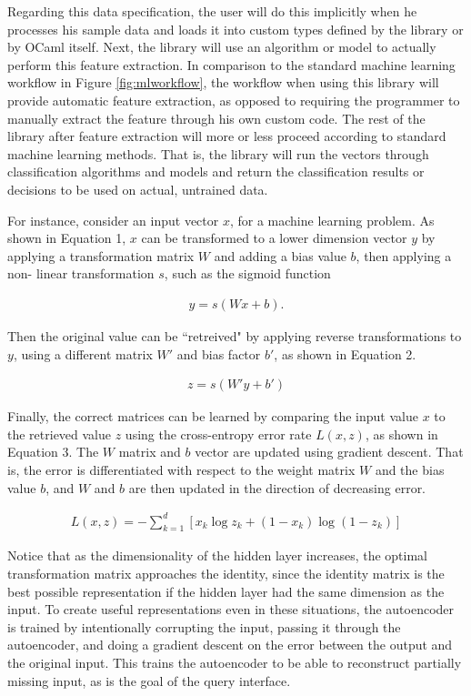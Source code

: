 \documentclass{sig-alternate}
\begin{document}
\vspace{10pt}

Regarding this data specification, the user will do this implicitly when he processes 
his sample data and loads it into custom types defined by the library or by OCaml itself. 
Next, the library will use an algorithm or model to actually perform this feature extraction. In 
comparison to the standard machine learning workflow in Figure \ref{fig:mlworkflow}, the workflow 
when using this library will provide automatic feature extraction, as opposed to requiring the 
programmer to manually extract the feature through his own custom code.  The rest of the library 
after feature extraction will more or less proceed according to standard machine learning methods.
That is, the library will run the vectors through classification algorithms and models 
and return the classification results or decisions to be used on actual, untrained data.

For instance, consider an input vector $x$, for a machine learning problem. As shown in Equation 1, $x$ can be transformed to a lower dimension 
vector $y$ by applying a transformation matrix $W$ and adding a bias value $b$, then applying a non-
linear transformation $s$, such as the sigmoid function

\begin{gather}
y = s(Wx + b).
\end{gather}

Then the original value can be ``retreived" by applying reverse transformations to $y$, using
a different matrix $W'$ and bias factor $b'$, as shown in Equation 2.

\begin{gather}
z = s(W' y  + b')
\end{gather}

Finally, the correct matrices can be learned by comparing the input value $x$ to the retrieved value $z$ 
using the cross-entropy error rate $L(x,z)$, as shown in Equation 3. The $W$ matrix and $b$ vector
are updated using gradient descent. That is, the error is differentiated
with respect to the weight matrix $W$ and the bias value $b$, and $W$ and $b$ are then updated in the
direction of decreasing error. 

\begin{gather}
L(x,z) = -\sum_{k=1}^d [x_k \log z_k + (1-x_k) \log( 1-z_k)]
\end{gather}

Notice that as the dimensionality
of the hidden layer increases, the optimal transformation matrix approaches the identity, since
the identity matrix is the best possible representation if the hidden layer had the same dimension
as the input. To create useful representations even in these situations, the autoencoder is trained
by intentionally corrupting the input, passing it through the autoencoder, and doing a gradient
descent on the error between the output and the original input. This trains the autoencoder
to be able to reconstruct partially missing input, as is the goal of the query interface.
\end{document}
